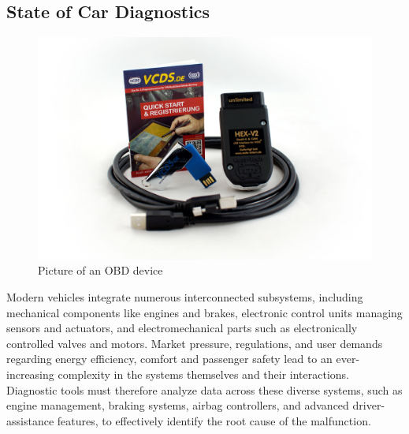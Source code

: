\subsection{State of Car Diagnostics}
\begin{figure}[ht]
  \centering
  \includegraphics[width=0.9\linewidth]{figures/obd_device.jpg}
  \caption{Picture of an OBD device}
  \label{fig:obd}
\end{figure}
Modern vehicles integrate numerous interconnected subsystems, including mechanical components like engines and brakes, 
electronic control units managing sensors and actuators, and electromechanical parts such as electronically controlled valves and motors. 
Market pressure, regulations, and user demands regarding energy efficiency, comfort and passenger safety lead to an ever-increasing complexity in the systems themselves and their interactions.
Diagnostic tools must therefore analyze data across these diverse systems, such as engine management, braking systems, airbag controllers, 
and advanced driver-assistance features, to effectively identify the root cause of the malfunction.

